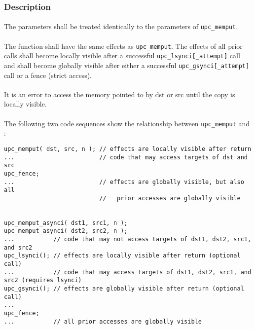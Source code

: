 \documentclass[10pt]{article}
\def \memput  {{\tt upc\_memput}}
\def \gsynci {{\tt upc\_gsynci[\_attempt]}}
\def \lsynci {{\tt upc\_lsynci[\_attempt]}}
\begin{document}
\subsubsection{Description}

\paragraph{} The parameters shall be treated identically to the parameters of
\memput{}.

\paragraph{} The \function{} function shall have the same effects as \memput{}.
The effects of all prior \function{} calls shall become locally visible after a
successful \lsynci{} call and shall become globally visible after either a
successful \gsynci{} call or a fence (strict access).

\paragraph{} It is an error to access the memory pointed to by dst or src until
the copy is locally visible.

\paragraph{} The following two code sequences show the relationship between
\memput{} and \function{}:

\begin{verbatim} 
upc_memput( dst, src, n ); // effects are locally visible after return
...                        // code that may access targets of dst and src
upc_fence;                 
...                        // effects are globally visible, but also all
                           //   prior accesses are globally visible


upc_memput_asynci( dst1, src1, n );
upc_memput_asynci( dst2, src2, n );
...           // code that may not access targets of dst1, dst2, src1, and src2
upc_lsynci(); // effects are locally visible after return (optional call)
...           // code that may access targets of dst1, dst2, src1, and src2 (requires lsynci)
upc_gsynci(); // effects are globally visible after return (optional call)
...
upc_fence;
...           // all prior accesses are globally visible
\end{verbatim}
\end{document}
